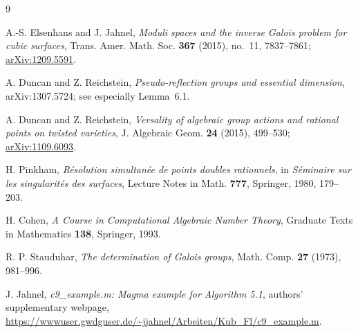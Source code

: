 \documentclass[11pt]{article}
\begin{document}
\begin{thebibliography}{9}

A.-S. Elsenhans and J. Jahnel,
\emph{Moduli spaces and the inverse Galois problem for cubic surfaces},
Trans. Amer. Math. Soc. \textbf{367} (2015), no.~11, 7837--7861;
\href{https://arxiv.org/abs/1209.5591}{arXiv:1209.5591}.

A. Duncan and Z. Reichstein,
\emph{Pseudo-reflection groups and essential dimension},
arXiv:1307.5724; see especially Lemma~6.1.

A. Duncan and Z. Reichstein,
\emph{Versality of algebraic group actions and rational points on twisted varieties},
J. Algebraic Geom. \textbf{24} (2015), 499--530;
\href{https://arxiv.org/abs/1109.6093}{arXiv:1109.6093}.

H. Pinkham,
\emph{R\'esolution simultan\'ee de points doubles rationnels},
in \emph{S\'eminaire sur les singularit\'es des surfaces},
Lecture Notes in Math. \textbf{777}, Springer, 1980, 179--203.

H. Cohen,
\emph{A Course in Computational Algebraic Number Theory},
Graduate Texts in Mathematics \textbf{138}, Springer, 1993.

R. P. Stauduhar,
\emph{The determination of Galois groups},
Math. Comp. \textbf{27} (1973), 981--996.

J. Jahnel,
\emph{c9\_example.m: Magma example for Algorithm 5.1},
authors' supplementary webpage,
\url{https://wwwuser.gwdguser.de/~jjahnel/Arbeiten/Kub_Fl/c9_example.m}.

\end{thebibliography}
\end{document}
